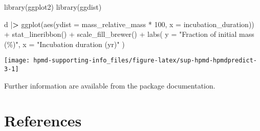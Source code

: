 \documentclass[
  12pt,
]{article}
\newenvironment{Shaded}{\begin{snugshade}}{\end{snugshade}}
\newcommand{\AttributeTok}[1]{\textcolor[rgb]{0.77,0.63,0.00}{#1}}
\newcommand{\DecValTok}[1]{\textcolor[rgb]{0.00,0.00,0.81}{#1}}
\newcommand{\ErrorTok}[1]{\textcolor[rgb]{0.64,0.00,0.00}{\textbf{#1}}}
\newcommand{\FunctionTok}[1]{\textcolor[rgb]{0.00,0.00,0.00}{#1}}
\newcommand{\NormalTok}[1]{#1}
\newcommand{\SpecialCharTok}[1]{\textcolor[rgb]{0.00,0.00,0.00}{#1}}
\newcommand{\StringTok}[1]{\textcolor[rgb]{0.31,0.60,0.02}{#1}}
\begin{document}
\begin{Shaded}
\begin{Highlighting}[]
\FunctionTok{library}\NormalTok{(ggplot2)}
\FunctionTok{library}\NormalTok{(ggdist)}

\NormalTok{d }\SpecialCharTok{|}\ErrorTok{\textgreater{}}
  \FunctionTok{ggplot}\NormalTok{(}\FunctionTok{aes}\NormalTok{(}\AttributeTok{ydist =}\NormalTok{ mass\_relative\_mass }\SpecialCharTok{*} \DecValTok{100}\NormalTok{, }\AttributeTok{x =}\NormalTok{ incubation\_duration)) }\SpecialCharTok{+}
  \FunctionTok{stat\_lineribbon}\NormalTok{() }\SpecialCharTok{+}
  \FunctionTok{scale\_fill\_brewer}\NormalTok{() }\SpecialCharTok{+}
  \FunctionTok{labs}\NormalTok{(}
    \AttributeTok{y =} \StringTok{"Fraction of initial mass (\%)"}\NormalTok{,}
    \AttributeTok{x =} \StringTok{"Incubation duration (yr)"}
\NormalTok{  )}
\end{Highlighting}
\end{Shaded}

\begin{center}\texttt{[image: hpmd-supporting-info\_files/figure-latex/sup-hpmd-hpmdpredict-3-1]} \end{center}

Further information are available from the package documentation.

\hypertarget{references}{%
\section*{References}\label{references}}
\end{document}
